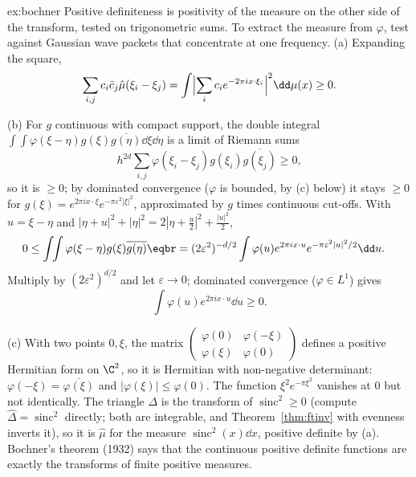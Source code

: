 \begin{solution}{ex:bochner}
\idea Positive definiteness is positivity of the measure on the other side of the transform, tested on trigonometric sums. To extract the measure from $\varphi$, test against Gaussian wave packets that
concentrate at one frequency.
\writeup (a) Expanding the square,
\[\sum_{i,j}c_i\bar c_j\hat\mu(\xi_i-\xi_j)=\int\Bigl|\sum_ic_ie^{-2\pi ix\cdot\xi_i}\Bigr|^2\dd\mu(x)\ge0.\]

(b) For $g$ continuous with compact support, the double integral $\int\!\!\int\varphi(\xi-\eta)g(\xi)\overline{g(\eta)}\dd\xi\dd\eta$ is a limit of Riemann sums
\[h^{2d}\sum_{i,j}\varphi(\xi_i-\xi_j)g(\xi_i)\overline{g(\xi_j)}\ge0,\]
so it is $\ge0$; by
dominated convergence ($\varphi$ is bounded, by (c) below) it stays $\ge0$ for $g(\xi)=e^{2\pi ix\cdot\xi}e^{-\pi\varepsilon^2|\xi|^2}$, approximated by $g$ times continuous cut-offs. With $u=\xi-\eta$ and
$|\eta+u|^2+|\eta|^2=2|\eta+\frac u2|^2+\frac{|u|^2}2$,
\[\begin{aligned}0&\le\int\!\!\int\varphi(\xi-\eta)g(\xi)\overline{g(\eta)}\eqbr=(2\varepsilon^2)^{-d/2}\int\varphi(u)e^{2\pi ix\cdot u}e^{-\pi\varepsilon^2|u|^2/2}\dd u.\end{aligned}\]
Multiply by $(2\varepsilon^2)^{d/2}$ and let $\varepsilon\to0$; dominated convergence ($\varphi\in L^1$) gives
\[
\int\varphi(u)e^{2\pi ix\cdot u}\dd u\ge0.
\]


(c) With two points $0,\xi$, the matrix $\begin{pmatrix}\varphi(0)&\varphi(-\xi)\\\varphi(\xi)&\varphi(0)\end{pmatrix}$ defines a positive Hermitian form on $\C^2$, so it is Hermitian with non-negative determinant: $\varphi(-\xi)=\overline{\varphi(\xi)}$ and
$|\varphi(\xi)|\le\varphi(0)$. The function $\xi^2e^{-\pi\xi^2}$ vanishes at $0$ but not identically. The triangle $\Delta$ is the transform of $\operatorname{sinc}^2\ge0$ (compute $\hat\Delta=\operatorname{sinc}^2$ directly; both are
integrable, and Theorem~\ref{thm:ftinv} with evenness inverts it), so it is $\hat\mu$ for the measure $\operatorname{sinc}^2(x)\dd x$, positive definite by (a). Bochner's theorem (1932) says that the continuous positive definite
functions are exactly the transforms of finite positive measures.
\end{solution}

